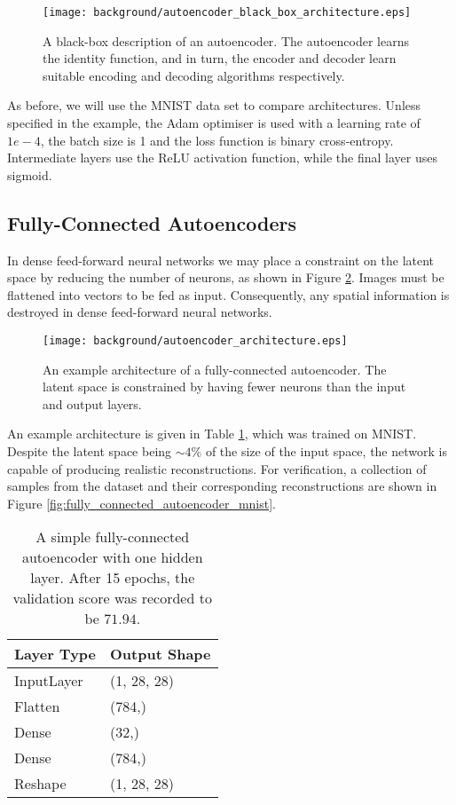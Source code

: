 \begin{figure}[h!]
\centering
\captionsetup{justification=centering}
\texttt{[image: background/autoencoder\_black\_box\_architecture.eps]}
\caption{A black-box description of an autoencoder. The autoencoder learns the identity function, and in turn, the encoder and decoder learn suitable encoding and decoding algorithms respectively.}
\label{fig:autoencoder_black_box_architecture}
\end{figure}

As before, we will use the MNIST data set to compare architectures. Unless specified in the example, the Adam optimiser is used with a learning rate of $1e-4$, the batch size is 1 and the loss function is binary cross-entropy. Intermediate layers use the ReLU activation function, while the final layer uses sigmoid.

\subsection{Fully-Connected Autoencoders}

In dense feed-forward neural networks we may place a constraint on the latent space by reducing the number of neurons, as shown in Figure \ref{fig:autoencoder_architecture}. Images must be flattened into vectors to be fed as input. Consequently, any spatial information is destroyed in dense feed-forward neural networks.

\begin{figure}[h!]
\centering
\captionsetup{justification=centering}
\texttt{[image: background/autoencoder\_architecture.eps]}
\caption{An example architecture of a fully-connected autoencoder. The latent space is constrained by having fewer neurons than the input and output layers.}
\label{fig:autoencoder_architecture}
\end{figure}

An example architecture is given in Table \ref{tab:fully_connected_autoencoder_architecture}, which was trained on MNIST. Despite the latent space being $\sim4\%$ of the size of the input space, the network is capable of producing realistic reconstructions. For verification, a collection of samples from the dataset and their corresponding reconstructions are shown in Figure \ref{fig:fully_connected_autoencoder_mnist}.

\begin{table}[h!]
\centering
\captionsetup{justification=centering}
\begin{tabular}{@{}ll@{}}
\toprule
\textbf{Layer Type} & \textbf{Output Shape} \\ \midrule
InputLayer & (1, 28, 28) \\
Flatten & (784,) \\
Dense & (32,) \\
Dense & (784,) \\
Reshape & (1, 28, 28) \\ \bottomrule
\end{tabular}
\caption{A simple fully-connected autoencoder with one hidden layer. After 15 epochs, the validation score was recorded to be $71.94$.}
\label{tab:fully_connected_autoencoder_architecture}
\end{table}

